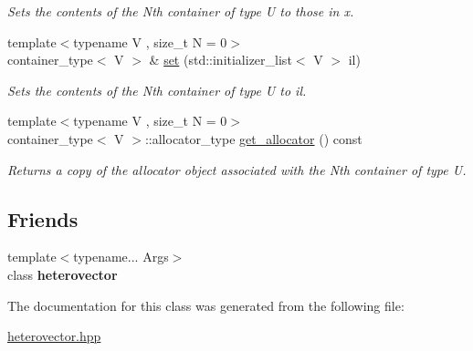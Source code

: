 \begin{DoxyCompactItemize}
\begin{DoxyCompactList}\small\item\em Sets the contents of the Nth container of type U to those in x. \end{DoxyCompactList}\item 
\hypertarget{classheterogeneous_1_1heterovector_3_01_t_01_4_a7fa83c24f7802132caf24dcb418973bf}{}{\footnotesize template$<$typename V , size\+\_\+t N = 0$>$ }\\container\+\_\+type$<$ V $>$ \& \hyperlink{classheterogeneous_1_1heterovector_3_01_t_01_4_a7fa83c24f7802132caf24dcb418973bf}{set} (std\+::initializer\+\_\+list$<$ V $>$ il)\label{classheterogeneous_1_1heterovector_3_01_t_01_4_a7fa83c24f7802132caf24dcb418973bf}

\begin{DoxyCompactList}\small\item\em Sets the contents of the Nth container of type U to il. \end{DoxyCompactList}\item 
\hypertarget{classheterogeneous_1_1heterovector_3_01_t_01_4_ac2ed7b15810d1b469db3785c14359456}{}{\footnotesize template$<$typename V , size\+\_\+t N = 0$>$ }\\container\+\_\+type$<$ V $>$\+::allocator\+\_\+type \hyperlink{classheterogeneous_1_1heterovector_3_01_t_01_4_ac2ed7b15810d1b469db3785c14359456}{get\+\_\+allocator} () const \label{classheterogeneous_1_1heterovector_3_01_t_01_4_ac2ed7b15810d1b469db3785c14359456}

\begin{DoxyCompactList}\small\item\em Returns a copy of the allocator object associated with the Nth container of type U. \end{DoxyCompactList}\end{DoxyCompactItemize}
\subsection*{Friends}
\begin{DoxyCompactItemize}
\item 
\hypertarget{classheterogeneous_1_1heterovector_3_01_t_01_4_acd0092b47333ef1d1254476c1c3390c4}{}{\footnotesize template$<$typename... Args$>$ }\\class {\bfseries heterovector}\label{classheterogeneous_1_1heterovector_3_01_t_01_4_acd0092b47333ef1d1254476c1c3390c4}

\end{DoxyCompactItemize}


The documentation for this class was generated from the following file\+:\begin{DoxyCompactItemize}
\item 
\hyperlink{heterovector_8hpp}{heterovector.\+hpp}\end{DoxyCompactItemize}
